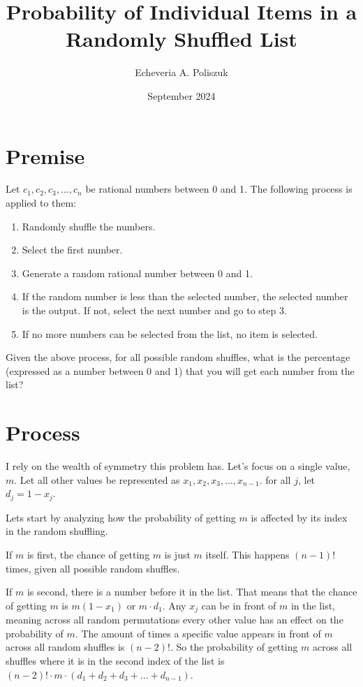 \documentclass{article}
\title{Probability of Individual Items in a Randomly Shuffled List}
\author{Echeveria A. Poliszuk}
\date{September 2024}
\begin{document}
\maketitle

\section{Premise}

Let $c_1, c_2, c_3, ..., c_n$ be rational numbers between 0 and 1. The following process is applied to them:

\begin{enumerate}
    \item Randomly shuffle the numbers.
    \item Select the first number.
    \item Generate a random rational number between 0 and 1.
    \item If the random number is less than the selected number, the selected number is the output. If not, select the next number and go to step 3.
    \item If no more numbers can be selected from the list, no item is selected.
\end{enumerate}

Given the above process, for all possible random shuffles, what is the percentage (expressed as a number between 0 and 1) that you will get each number from the list?

\section{Process}

I rely on the wealth of symmetry this problem has. Let's focus on a single value, $m$.
Let all other values be represented as $x_1, x_2, x_3, ..., x_{n-1}$. for all $j$, let $d_j = 1 - x_j$.

Lets start by analyzing how the probability of getting $m$ is affected by its index in the random shuffling.

If $m$ is first, the chance of getting $m$ is just $m$ itself. This happens $(n - 1)!$ times, given all possible random shuffles.

If $m$ is second, there is a number before it in the list. That means that the chance of getting $m$ is $m(1 - x_1)$ or $m\cdot d_1$. Any $x_j$ can be in front of $m$ in the list, meaning across all random permutations every other value has an effect on the probability of $m$. The amount of times a specific value appears in front of $m$ across all random shuffles is $(n - 2)!$. So the probability of getting $m$ across all shuffles where it is in the second index of the list is $(n - 2)! \cdot m \cdot (d_1 + d_2 + d_3 + ... + d_{n-1})$.
\end{document}
